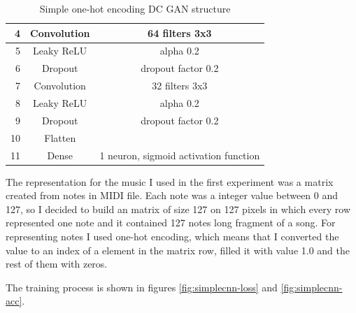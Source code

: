 \documentclass[]{article}
\begin{document}
\begin{table}[h!]
\begin{tabular}{|r|c|c|}
		4                                    & Convolution         & 64 filters 3x3                            \\ \hline
		5                                    & Leaky ReLU          & alpha 0.2                                 \\ \hline
		6                                    & Dropout             & dropout factor 0.2                        \\ \hline
		7                                    & Convolution         & 32 filters 3x3                            \\ \hline
		8                                    & Leaky ReLU          & alpha 0.2                                 \\ \hline
		9                                    & Dropout             & dropout factor 0.2                        \\ \hline
		10                                   & Flatten             &                                           \\ \hline
		11                                   & Dense               & 1 neuron, sigmoid activation function     \\ \hline
	\end{tabular}
	\caption{Simple one-hot encoding DC GAN structure}
	\label{ohe-dcgan}
\end{table}

The representation for the music I used in the first experiment was a matrix created from notes in MIDI file. Each note was a integer value between 0 and 127, so I decided to build an matrix of size 127 on 127 pixels in which every row represented one note and it contained 127 notes long fragment of a song. For representing notes I used one-hot encoding, which means that I converted the value to an index of a element in the matrix row, filled it with value 1.0 and the rest of them with zeros.

The training process is shown in figures \ref{fig:simplecnn-loss} and \ref{fig:simplecnn-acc}. 
\end{document}
